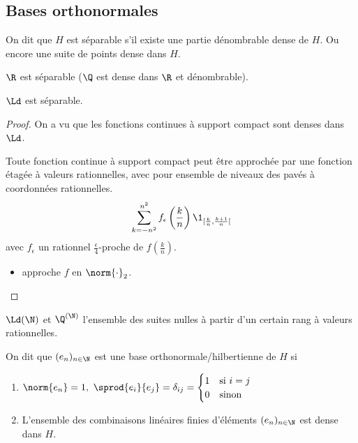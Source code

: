 \subsection{Bases orthonormales}


\begin{definition}
	On dit que $H$ est séparable s'il existe une partie dénombrable dense de $H$. Ou encore une suite de points dense dans $H$.
\end{definition}


\begin{example}
	$\R$ est séparable ($\Q$ est dense dans $\R$ et dénombrable).
\end{example}

\begin{example}
	$\Ld$ est séparable.
\end{example}

\begin{proof}
	On a vu que les fonctions continues à support compact sont denses dans $\Ld$.


	Toute fonction continue à support compact peut être approchée par une fonction étagée à valeurs rationnelles,
	avec pour ensemble de niveaux des pavés à coordonnées rationnelles.
	$$ \sum_{k=-n^2}^{n^2} f_{\epsilon} \left(\frac k n\right) \1_{[\frac k n, \frac {k+1} n[} $$
	avec $f_{\epsilon}$ un rationnel $\frac {\epsilon} 4$-proche de $f\left(\frac k n\right)$.

	\begin{itemize}
		\item approche $f$ en $\norm{\cdot}_2$.
	\end{itemize}

\end{proof}

\begin{example}
	$\Ld(\N)$ et $\Q^{(\N)}$ l'ensemble des suites nulles à partir d'un certain rang à valeurs rationnelles.
\end{example}

\begin{definition}
	On dit que $(e_n)_{n\in \N}$ est une base orthonormale/hilbertienne de $H$ si
	\begin{enumerate}
		\item $\norm {e_n} = 1, \ \sprod {e_i} {e_j} = \delta_{ij} = \begin{cases} 1 & \text{si } i=j \\ 0 & \text{sinon} \end{cases}$
		\item L'ensemble des combinaisons linéaires finies d'éléments $(e_n)_{n\in \N}$ est dense dans $H$.
	\end{enumerate}
\end{definition}


